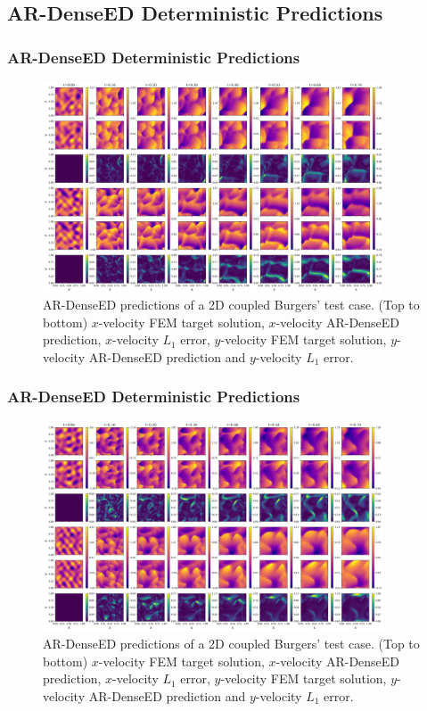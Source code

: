 \documentclass{beamer}
\theoremstyle{remark}
\begin{document}
\subsection{AR-DenseED Deterministic Predictions}
\begin{frame}
\frametitle{AR-DenseED Deterministic Predictions}
%
\begin{figure}[H]
    \centering
    \includegraphics[width=0.9\textwidth]{Fig18.png}
    \caption{AR-DenseED predictions of a 2D coupled Burgers' test case. (Top to bottom) $x$-velocity FEM target solution, $x$-velocity AR-DenseED prediction, $x$-velocity $L_1$ error, $y$-velocity FEM target solution, $y$-velocity AR-DenseED prediction and $y$-velocity $L_1$ error.}
    \label{fig:burgers1D-ARDenseED-1}
\end{figure}

\end{frame}


\begin{frame}
\frametitle{AR-DenseED Deterministic Predictions}
%
\begin{figure}[H]
    \centering
    \includegraphics[width=0.9\textwidth]{Fig19.png}
    \caption{AR-DenseED predictions of a 2D coupled Burgers' test case. (Top to bottom) $x$-velocity FEM target solution, $x$-velocity AR-DenseED prediction, $x$-velocity $L_1$ error, $y$-velocity FEM target solution, $y$-velocity AR-DenseED prediction and $y$-velocity $L_1$ error.}
    \label{fig:burgers1D-ARDenseED-2}
\end{figure}
%
\end{frame}
\end{document}
